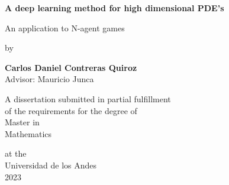 \begin{titlepage}
    \begin{center}
        \vspace*{1cm}
        
        \Huge
        \textbf{A deep learning method for high dimensional PDE's}
        
        \vspace{0.5cm}
        \LARGE
        An application to N-agent games\\
        \vspace{0.5cm}
   
        by\\
        \vspace{0.5cm}
    
        \textbf{Carlos Daniel Contreras Quiroz}\\
        \vspace*{1cm}
        Advisor: Mauricio Junca
        
        \vfill
        
        A dissertation submitted in partial fulfillment\\
        of the requirements for the degree of\\
        Master in\\
        Mathematics\\
    
        
        \vspace{1.8cm}

        
        \Large
        at the\\Universidad de los Andes\\
        2023\\
        \vspace{1.0cm}
       
        
    \end{center}
    
\end{titlepage}